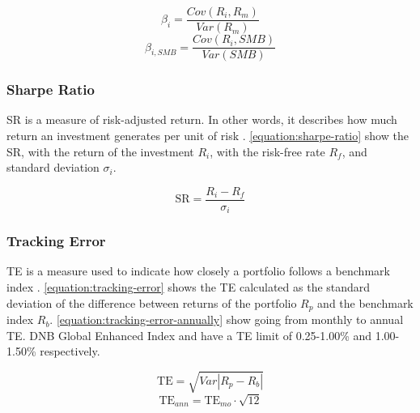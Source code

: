 \vspace{-1em}
\begin{equation}
\label{equation:beta-in-capm}
    \beta_i = \frac{Cov(R_i, R_m)}{Var(R_m)}
\end{equation}
\begin{equation}
\label{equation:beta-in-fama-french}
    \beta_{i,SMB} = \frac{Cov(R_i, SMB)}{Var(SMB)} 
\end{equation}

\subsubsection{Sharpe Ratio}

SR is a measure of risk-adjusted return. In other words, it describes how much return an investment generates per unit of risk \parencite{sharpe-capital-asset-prices}. \autoref{equation:sharpe-ratio} show the SR, with the return of the investment $R_i$, with the risk-free rate $R_f$, and standard deviation $\sigma_i$. 

\vspace{-1em}
\begin{equation}
\label{equation:sharpe-ratio}
    \text{SR} = \frac{R_i - R_f}{\sigma_i}
\end{equation}

\subsubsection{Tracking Error}

TE is a measure used to indicate how closely a portfolio follows a benchmark index \parencite{roll-a-mean-variance-analysis-of-tracking-error}. \autoref{equation:tracking-error} shows the TE calculated as the standard deviation of the difference between returns of the portfolio $R_p$ and the benchmark index $R_b$. \autoref{equation:tracking-error-annually} show going from monthly to annual TE. DNB Global Enhanced Index \parencite*{dnb-global-enhanced-index} and \textcite{nbim-investing-in-equities} have a TE limit of 0.25-1.00\% and 1.00-1.50\% respectively.

\vspace{-1em}
\begin{equation}
\label{equation:tracking-error}
    \text{TE} = \sqrt{Var \left| R_p-R_b \right| } 
\end{equation}
\begin{equation}
\label{equation:tracking-error-annually}
    \text{TE}_{ann} = \text{TE}_{mo} \cdot \sqrt{12}
\end{equation}

